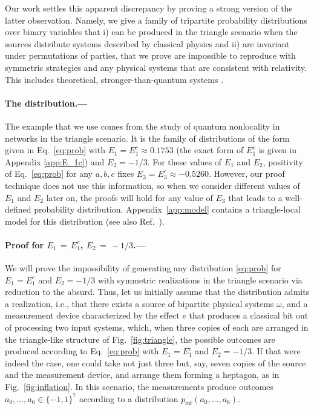 \documentclass[aps,physrev,reprint,superscriptaddress,nofootinbib,twocolumn]{revtex4-2}
\begin{document}
Our work settles this apparent discrepancy by proving a strong version of the latter observation.
Namely, we give a family of tripartite probability distributions over binary variables that i) can be produced in the triangle scenario when the sources distribute systems described by classical physics and ii) are invariant under permutations of parties, that we prove are impossible to reproduce with symmetric strategies and any physical systems that are consistent with relativity.
This includes theoretical, stronger-than-quantum systems \cite{Henson2014,janotta2014,plavala2023}.

\paragraph*{The distribution.---}
The example that we use comes from the study of quantum nonlocality in networks \cite{TavakoliPozas2022} in the triangle scenario. 
It is the family of distributions of the form given in Eq.~\eqref{eq:prob} with $E_1=E_1^c\approx0.1753$ (the exact form of $E_1^c$ is given in Appendix \ref{app:E_1c}) and $E_2=-1/3$.
For these values of $E_1$ and $E_2$, positivity of Eq.~\eqref{eq:prob} for any $a,b,c$ fixes $E_3=E_3^c\approx-0.5260$.
However, our proof technique does not use this information, so when we consider different values of $E_1$ and $E_2$ later on, the proofs will hold for any value of $E_3$ that leads to a well-defined probability distribution.
Appendix~\ref{app:model} contains a triangle-local model for this distribution (see also Ref.~\cite{gisin2020}).

\paragraph*{Proof for $E_1\,{=}\,E_1^c$, $E_2\,{=}\,{-}1/3$.---} 
We will prove the impossibility of generating any distribution \eqref{eq:prob} for $E_1=E_1^c$ and $E_2=-1/3$ with symmetric realizations in the triangle scenario via reduction to the absurd.
Thus, let us initially assume that the distribution admits a realization, i.e., that there exists a source of bipartite physical systems $\omega$, and a measurement device characterized by the effect $e$ that produces a classical bit out of processing two input systems, which, when three copies of each are arranged in the triangle-like structure of Fig.~\ref{fig:triangle}, the possible outcomes are produced according to Eq.~\eqref{eq:prob} with $E_1=E_1^c$ and $E_2=-1/3$.
If that were indeed the case, one could take not just three but, say, seven copies of the source and the measurement device, and arrange them forming a heptagon, as in Fig.~\ref{fig:inflation}.
In this scenario, the measurements produce outcomes $a_0,\dots,a_6\in\{-1,1\}^7$ according to a distribution $p_\text{inf}(a_0,\dots,a_6)$.
\end{document}
